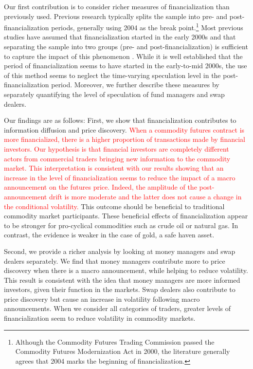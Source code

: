 \documentclass[12pt]{article}
\begin{document}
Our first contribution is to consider richer measures of financialization than previously used. Previous research typically splits the sample into pre- and post-financialization periods, generally using 2004 as the break point.\footnote{Although the Commodity Futures Trading Commission passed the Commodity Futures Modernization Act in 2000, the literature generally agrees that 2004 marks the beginning of financialization.} Most previous studies have assumed that financialization started in the early 2000s and that separating the sample into two groups (pre- and post-financialization) is sufficient to capture the impact of this phenomenon \citep{buyukcsahin2010matters, kilian2014role,brunetti2016speculators,irwin2012financialization,stoll2010commodity,alquist2013role}. While it is well established that the period of financialization seems to have started in the early-to-mid 2000s, the use of this method seems to neglect the time-varying speculation level in the post-financialization period. Moreover, we further describe these measures by separately quantifying the level of speculation of fund managers and swap dealers.

 Our findings are as follows: First, we show that financialization contributes to information diffusion and price discovery. \textcolor{red}{When a commodity futures contract is more financialized, there is a higher proportion of transactions made by financial investors. Our hypothesis is that financial investors are completely different actors from commercial traders bringing new information to the commodity market. This interpretation is consistent with our results showing that an increase in the level of financialization seems to reduce the impact of a macro announcement on the futures price. Indeed, the amplitude of the post-announcement drift is more moderate and the latter does not cause a change in the conditional volatility.}
  This outcome should be beneficial to traditional commodity market participants.  These beneficial effects of financialization appear to be stronger for pro-cyclical commodities such as crude oil or natural gas. In contrast, the evidence is weaker in the case of gold, a safe haven asset. %

Second, we provide a richer analysis by looking at money managers and swap dealers separately. We find that money managers contribute more to price discovery when there is a macro announcement, while helping to reduce volatility. This result is consistent with the idea that money managers are more informed investors, given their function in the markets. Swap dealers also contribute to price discovery but  cause an increase in volatility following macro announcements. When we consider all categories of traders, greater levels of financialization seem to reduce  volatility in commodity markets. 
\end{document}
